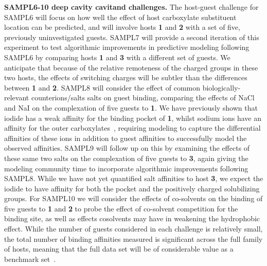 \documentclass[11pt]{article}
\begin{document}
{\bf SAMPL6-10 deep cavity cavitand challenges.} 
The host-guest challenge for SAMPL6 will focus on how well the effect of host carboxylate substituent location can be predicted, and will involve hosts {\bf 1} and {\bf 2} with a set of five, previously uninvestigated guests.  
SAMPL7 will provide a second iteration of this experiment to test algorithmic improvements in predictive modeling following SAMPL6 by comparing hosts {\bf 1} and {\bf 3} with a different set of guests.  
We anticipate that because of the relative remoteness of the charged groups in these two hosts, the effects of switching charges will be subtler than the differences between {\bf 1} and {\bf 2}.  
SAMPL8 will consider the effect of common biologically-relevant counterions/salts salts on guest binding, comparing the effects of NaCl and NaI on the complexation of five guests to {\bf 1}.  
We have previously shown that iodide has a weak affinity for the binding pocket of {\bf 1}, whilst sodium ions have an affinity for the outer carboxylates~\cite{carnegie_anion_2014}, requiring modeling to capture the differential affinities of these ions in addition to guest affinities to successfully model the observed affinities.  
SAMPL9 will follow up on this by examining the effects of these same two salts on the complexation of five guests to {\bf 3}, again giving the modeling community time to incorporate algorithmic improvements following SAMPL8. 
While we have not yet quantified salt affinities to host {\bf 3}, we expect the iodide to have affinity for both the pocket and the positively charged solubilizing groups.  
For SAMPL10 we will consider the effects of co-solvents on the binding of five guests to {\bf 1} and {\bf 2} to probe the effect of co-solvent competition for the binding site, as well as effects cosolvents may have in weakening the hydrophobic effect. 
While the number of guests considered in each challenge is relatively small, the total number of binding affinities measured is significant across the full family of hosts, meaning that the full data set will be of considerable value as a benchmark set~\cite{mobley_predicting_2016}. 
\end{document}
